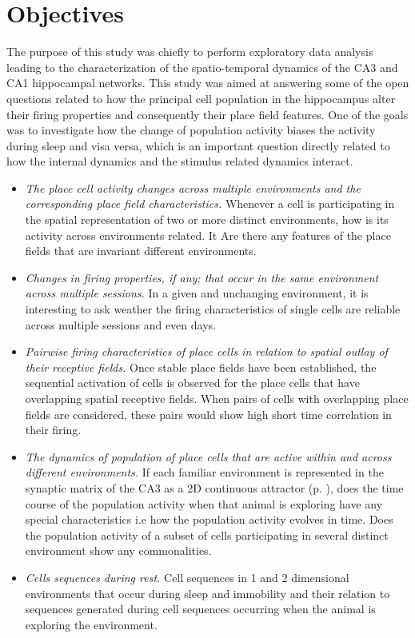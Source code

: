 \section{Objectives}
The purpose of this study was chiefly to perform exploratory data analysis leading to the characterization of the spatio-temporal dynamics of the CA3 and CA1 hippocampal networks. This study was aimed at answering some of the  open questions related to how the principal cell population in the hippocampus alter their firing properties and consequently their place field features. One of the goals was to investigate how the change of population activity biases the activity during sleep and visa versa, which is an important question directly related to how the internal dynamics and the stimulus related dynamics interact. 
\begin{itemize}
\item \emph{The place cell activity changes across multiple environments and the corresponding place field characteristics.}
Whenever a cell is participating in the spatial representation of two or more distinct environments, how is its activity across environments related. It Are there any features of the place fields that are invariant  different environments.
\item \emph{Changes in firing properties, if any; that occur in the same environment across multiple sessions.}
In a given and unchanging environment, it is interesting to ask weather the firing characteristics of single cells are reliable across multiple sessions and even days.
\item \emph{Pairwise firing characteristics of place cells in relation to spatial outlay of their receptive fields.}
Once stable place fields have been established, the sequential activation of cells is observed for the place cells that have overlapping spatial receptive fields. When pairs of cells with overlapping place fields are considered, these pairs would show high short time correlation in their firing.
\item \emph{The dynamics of population of place cells that are active within and across different environments.}
If each familiar environment is represented in the synaptic matrix of the CA3 as a 2D continuous attractor (p. \pageref{fixedpt}), does the time course of the population activity when that animal is exploring have any special characteristics i.e how the population activity evolves in time. Does the population activity of a subset of cells participating in several distinct environment show any commonalities.

\item \emph{Cells sequences during rest.} Cell sequences in 1 and 2 dimensional environments that occur during sleep and immobility and their relation to sequences generated during cell sequences occurring when the animal is exploring the environment. 
\end{itemize}
 